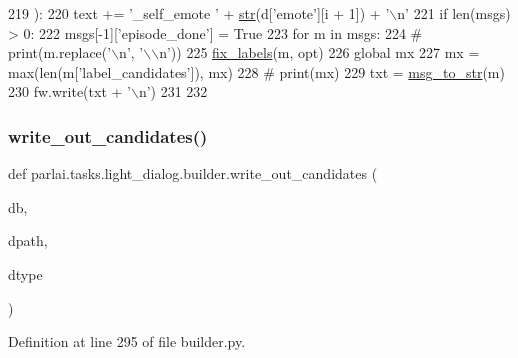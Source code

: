 \begin{DoxyCode}
219             ):
220                 text += \textcolor{stringliteral}{'\_self\_emote '} + \hyperlink{namespacegenerate__task__READMEs_a5b88452ffb87b78c8c85ececebafc09f}{str}(d[\textcolor{stringliteral}{'emote'}][i + 1]) + \textcolor{stringliteral}{'\(\backslash\)n'}
221     \textcolor{keywordflow}{if} len(msgs) > 0:
222         msgs[-1][\textcolor{stringliteral}{'episode\_done'}] = \textcolor{keyword}{True}
223         \textcolor{keywordflow}{for} m \textcolor{keywordflow}{in} msgs:
224             \textcolor{comment}{# print(m.replace('\(\backslash\)n', '\(\backslash\)\(\backslash\)n'))}
225             \hyperlink{namespaceparlai_1_1tasks_1_1light__dialog_1_1builder_aafb760ba2e05ffe5cad429327d0dd347}{fix\_labels}(m, opt)
226             \textcolor{keyword}{global} mx
227             mx = max(len(m[\textcolor{stringliteral}{'label\_candidates'}]), mx)
228             \textcolor{comment}{# print(mx)}
229             txt = \hyperlink{namespaceparlai_1_1utils_1_1misc_ae5db473b41d3b49814e2566e866282b6}{msg\_to\_str}(m)
230             fw.write(txt + \textcolor{stringliteral}{'\(\backslash\)n'})
231 
232 
\end{DoxyCode}
\mbox{\label{namespaceparlai_1_1tasks_1_1light__dialog_1_1builder_a25aca9f28e4406290624e1d0c5cce0d6}} 
\subsubsection{\texorpdfstring{write\+\_\+out\+\_\+candidates()}{write\_out\_candidates()}}
{\footnotesize\ttfamily def parlai.\+tasks.\+light\+\_\+dialog.\+builder.\+write\+\_\+out\+\_\+candidates (\begin{DoxyParamCaption}\item[{}]{db,  }\item[{}]{dpath,  }\item[{}]{dtype }\end{DoxyParamCaption})}



Definition at line 295 of file builder.\+py.


